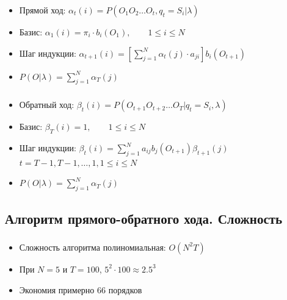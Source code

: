 \documentclass{beamer}
\begin{document}
\begin{frame} 
  \frametitle{\insertsection}
  \framesubtitle{\insertsubsection}
  \begin{itemize}
  \item Прямой ход: $ \alpha_t(i) = P(O_1 O_2 \ldots O_t, q_t = S_i | \lambda)$
    \pause
  \item Базис: $ \alpha_1(i) = \pi_i \cdot b_i(O_1), \qquad 1 \le i \le N$
  \item Шаг индукции: $\displaystyle \alpha_{t + 1}(i) = \left [ \sum_{j = 1}^{N} \alpha_t(j) \cdot a_{ji} \right ] b_i(O_{t + 1})$
    \pause
  \item $\displaystyle P(O|\lambda) = \sum_{j = 1}^{N} \alpha_T(j)$
  \end{itemize}
\end{frame}

\begin{frame} 
  \frametitle{\insertsection}
  \framesubtitle{\insertsubsection}
  \begin{itemize}
  \item Обратный ход: $ \beta_t(i) = P(O_{t + 1} O_{t + 2} \ldots O_T | q_t = S_i , \lambda)$
    \pause
  \item Базис: $ \beta_T(i) = 1, \qquad 1 \le i \le N$
  \item Шаг индукции: $\displaystyle \beta_{t}(i) = \sum_{j = 1}^{N} a_{ij} b_{j}(O_{t + 1})\beta_{t + 1}(j)$ \\
    $t = T - 1, T - 1, \ldots, 1, 1 \le i \le N$
    \pause
  \item $\displaystyle P(O|\lambda) = \sum_{j = 1}^{N} \alpha_T(j)$
  \end{itemize}
\end{frame}

\subsection{Алгоритм прямого-обратного хода. Сложность}

\begin{frame} 
  \frametitle{\insertsection}
  \framesubtitle{\insertsubsection}
  \begin{itemize}
  \item Сложность алгоритма полиномиальная: $O(N^2T)$
    \pause
  \item При $N = 5$ и  $T = 100$, $5^2 \cdot 100 \approx 2.5^3$ \pause
    \item Экономия примерно $66$ порядков
  \end{itemize}
\end{frame}
\end{document}

